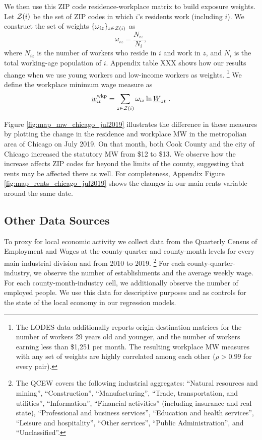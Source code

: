 We then use this ZIP code residence-workplace matrix to build exposure weights.
Let $\mathcal{Z}(i)$ be the set of ZIP codes in which $i$'s residents work 
(including $i$).
We construct the set of weights $\{\omega_{iz}\}_{z\in\mathcal{Z}(i)}$ as 
$$
\omega_{iz} = \frac{N_{iz}}{N_i} ,
$$
where 
$N_{iz}$ is the number of workers who reside in $i$ and work in $z$, 
and $N_i$ is the total working-age population of $i$.
Appendix table XXX shows how our results change when we use young workers
and low-income workers as weights.%
\footnote{The LODES data additionally reports origin-destination matrices for 
the number of workers 29 years old and younger, and the number of workers 
earning less than \$1,251 per month.
The resulting workplace MW measures with any set of weights are highly correlated 
among each other ($\rho>0.99$ for every pair).}
We define the workplace minimum wage measure as
\begin{equation}
    \underline{w}^{\text{wkp}}_{it} = \sum_{z\in\mathcal{Z}(i)} \omega_{iz} \ln \underline{W}_{zt} \ .
\end{equation}

Figure \ref{fig:map_mw_chicago_jul2019} illustrates the difference in these 
measures by plotting the change in the residence and workplace MW 
in the metropolian area of Chicago on July 2019.
On that month, both Cook County and the city of Chicago increased the statutory 
MW from \$12 to \$13.
We observe how the increase affects ZIP codes far beyond the limits of the 
county, suggesting that rents may be affected there as well.
For completeness, Appendix Figure \ref{fig:map_rents_chicago_jul2019} shows
the changes in our main rents variable around the same date.

\subsection{Other Data Sources}\label{sec:data_other}

To proxy for local economic activity we collect data from the 
Quarterly Census of Employment and Wages \parencite[QCEW;][]{QCEW} 
at the county-quarter and county-month levels 
for every main industrial division and from 2010 to 2019.%
\footnote{The QCEW covers the following industrial aggregates: 
``Natural resources and mining'', ``Construction'', ``Manufacturing'', 
``Trade, transportation, and utilities'', ``Information'', 
``Financial activities'' (including insurance and real state), 
``Professional and business services'', ``Education and health services'', 
``Leisure and hospitality'', ``Other services'', ``Public Administration'',
and ``Unclassified''.}
For each county-quarter-industry, we observe the number of establishments and the 
average weekly wage. For each county-month-industry cell, we additionally observe the number 
of employed people. We use this data for descriptive purposes and as controls for the 
state of the local economy in our regression models.

